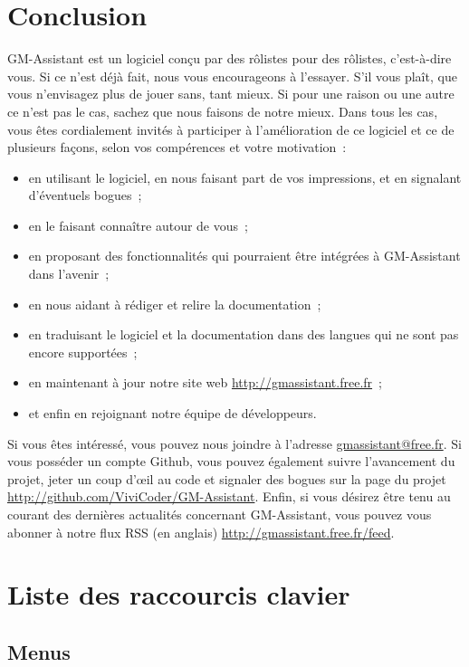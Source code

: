 \documentclass[a4paper,12pt]{article}
\newcommand*{\GMA}{GM-Assistant\xspace}
\begin{document}
\section{Conclusion}\label{conclusions}
\GMA est un logiciel conçu par des rôlistes pour des rôlistes, c'est-à-dire vous.
Si ce n'est déjà fait, nous vous encourageons à l'essayer.
S'il vous plaît, que vous n'envisagez plus de jouer sans, tant mieux.
Si pour une raison ou une autre ce n'est pas le cas, sachez que nous faisons de notre mieux.
Dans tous les cas, vous êtes cordialement invités à participer à l'amélioration de ce logiciel et ce de plusieurs façons, selon vos compérences et votre motivation~:
\begin{itemize}
    \item en utilisant le logiciel, en nous faisant part de vos impressions, et en signalant d'éventuels bogues~;
    \item en le faisant connaître autour de vous~;
    \item en proposant des fonctionnalités qui pourraient être intégrées à \GMA dans l'avenir~;
    \item en nous aidant à rédiger et relire la documentation~;
    \item en traduisant le logiciel et la documentation dans des langues qui ne sont pas encore supportées~;
    \item en maintenant à jour notre site web \url{http://gmassistant.free.fr}~;
    \item et enfin en rejoignant notre équipe de développeurs.
\end{itemize}

Si vous êtes intéressé, vous pouvez nous joindre à l'adresse \url{gmassistant@free.fr}.
Si vous posséder un compte Github, vous pouvez également suivre l'avancement du projet, jeter un coup d'œil au code et signaler des bogues sur la page du projet \url{http://github.com/ViviCoder/GM-Assistant}.
Enfin, si vous désirez être tenu au courant des dernières actualités concernant GM-Assistant, vous pouvez vous abonner à notre flux RSS (en anglais) \url{http://gmassistant.free.fr/feed}.

\appendix

\section{Liste des raccourcis clavier}
\label{sec:raccourcis}

\subsection{Menus}
\end{document}
